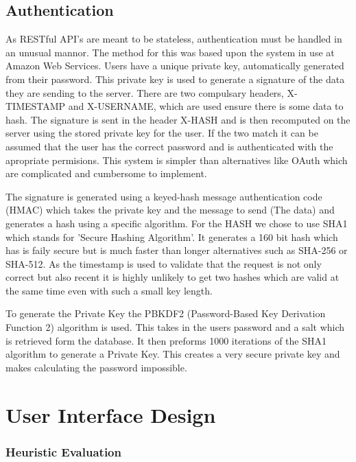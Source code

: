 \documentclass[11pt,a4paper]{article}
\begin{document}
\subsection{Authentication}

As RESTful API's are meant to be stateless, authentication must be handled in an unusual mannor. The method for this was based upon the system in use at Amazon Web Services\cite{auth}. Users have a unique private key, automatically generated from their password. This private key is used to generate a signature of the data they are sending to the server. There are two compulsary headers, X-TIMESTAMP and X-USERNAME, which are used ensure there is some data to hash. The signature is sent in the header X-HASH and is then recomputed on the server using the stored private key for the user. If the two match it can be assumed that the user has the correct password and is authenticated with the apropriate permisions. This system is simpler than alternatives like OAuth which are complicated and cumbersome to implement. 

The signature is generated using a keyed-hash message authentication code (HMAC) which takes the private key and the message to send (The data) and generates a hash using a specific algorithm. For the HASH we chose to use SHA1 which stands for 'Secure Hashing Algorithm'. It generates a 160 bit hash which has is faily secure but is much faster than longer alternatives such as SHA-256 or SHA-512. As the timestamp is used to validate that the request is not only correct but also recent it is highly unlikely to get two hashes which are valid at the same time even with such a small key length. 

To generate the Private Key the PBKDF2 (Password-Based Key Derivation Function 2) algorithm is used. This takes in the users password and a salt which is retrieved form the database. It then preforms 1000 iterations of the SHA1 algorithm to generate a Private Key. This creates a very secure private key and makes calculating the password impossible. 




\section{User Interface Design}

\subsubsection{Heuristic Evaluation}
\end{document}
